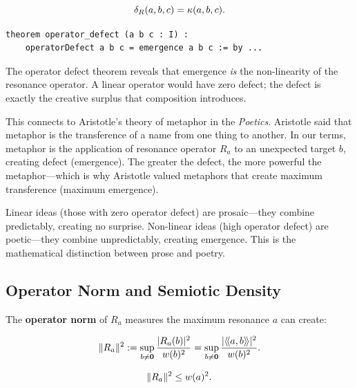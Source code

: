 \begin{theorem}
\label{thm:operator-defect-emergence}
\[
  \delta_R(a, b, c) = \kappa(a, b, c).
\]
\end{theorem}

\begin{lstlisting}[caption={Operator defect (IDT\_v3\_Emergence.lean)}]
theorem operator_defect (a b c : I) :
    operatorDefect a b c = emergence a b c := by ...
\end{lstlisting}

\begin{interpretation}
The operator defect theorem reveals that emergence \emph{is} the non-linearity
of the resonance operator. A linear operator would have zero defect; the defect
is exactly the creative surplus that composition introduces.

This connects to Aristotle's theory of metaphor in the \emph{Poetics}. Aristotle
said that metaphor is the transference of a name from one thing to another.
In our terms, metaphor is the application of resonance operator $R_a$ to an
unexpected target $b$, creating defect (emergence). The greater the defect,
the more powerful the metaphor---which is why Aristotle valued metaphors that
create maximum transference (maximum emergence).

Linear ideas (those with zero operator defect) are prosaic---they combine
predictably, creating no surprise. Non-linear ideas (high operator defect) are
poetic---they combine unpredictably, creating emergence. This is the mathematical
distinction between prose and poetry.
\end{interpretation}

\subsection{Operator Norm and Semiotic Density}

The \textbf{operator norm} of $R_a$ measures the maximum resonance $a$ can
create:

\begin{definition}
\label{def:operator-norm}
\[
  \|R_a\|^2 := \sup_{b \neq \mathbf{0}} \frac{|R_a(b)|^2}{w(b)^2} = \sup_{b \neq \mathbf{0}} \frac{|\langle\!\langle a, b \rangle\!\rangle|^2}{w(b)^2}.
\]
\end{definition}

\begin{theorem}
\label{thm:operator-norm-bound}
\[
  \|R_a\|^2 \leq w(a)^2.
\]
\end{theorem}

